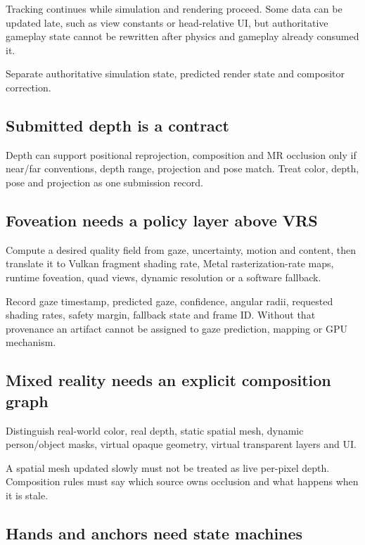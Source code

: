 Tracking continues while simulation and rendering proceed. Some data can be updated late, such as view constants or head-relative UI, but authoritative gameplay state cannot be rewritten after physics and gameplay already consumed it.

Separate authoritative simulation state, predicted render state and compositor correction.

\subsection{Submitted depth is a contract}\label{submitted-depth-is-a-contract}

Depth can support positional reprojection, composition and MR occlusion only if near/far conventions, depth range, projection and pose match. Treat color, depth, pose and projection as one submission record.

\subsection{Foveation needs a policy layer above VRS}\label{foveation-needs-a-policy-layer-above-vrs}

Compute a desired quality field from gaze, uncertainty, motion and content, then translate it to Vulkan fragment shading rate, Metal rasterization-rate maps, runtime foveation, quad views, dynamic resolution or a software fallback.

Record gaze timestamp, predicted gaze, confidence, angular radii, requested shading rates, safety margin, fallback state and frame ID. Without that provenance an artifact cannot be assigned to gaze prediction, mapping or GPU mechanism.

\subsection{Mixed reality needs an explicit composition graph}\label{mixed-reality-needs-an-explicit-composition-graph}

Distinguish real-world color, real depth, static spatial mesh, dynamic person/object masks, virtual opaque geometry, virtual transparent layers and UI.

A spatial mesh updated slowly must not be treated as live per-pixel depth. Composition rules must say which source owns occlusion and what happens when it is stale.

\subsection{Hands and anchors need state machines}\label{hands-and-anchors-need-state-machines}

